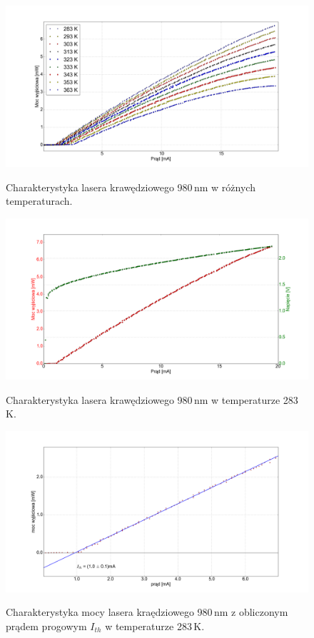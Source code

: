 \documentclass[a4paper, portrait,12pt]{report}
\begin{document}
\newpage


\begin{figure}
\center
  \includegraphics[scale=0.30]{plot980/plot_all.png}
  \label{rys1}
  \caption{Charakterystyka lasera krawędziowego 980\,nm w różnych temperaturach. } 
\end{figure}


\newpage
\begin{figure}
\center
  \includegraphics[scale=0.30]{plot980/temp_10_IVL.png}
  \label{rys1}
  \caption{Charakterystyka lasera krawędziowego 980\,nm w temperaturze 283\,K.} 
\end{figure}

\begin{figure}
\center
  \includegraphics[scale=0.30]{plot980/temp_10_fit.png}
  \label{rys1}
  \caption{Charakterystyka mocy lasera kraędziowego 980\,nm z obliczonym prądem progowym $I_{th}$  w temperaturze 283\,K.} 
\end{figure}
\end{document}
